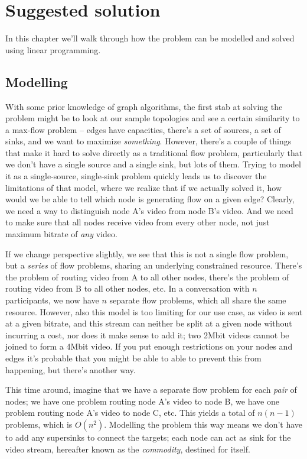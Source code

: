 \chapter{Suggested solution}
\label{chp:suggested-solution}

In this chapter we'll walk through how the problem can be modelled and solved using linear programming.


\section{Modelling}

With some prior knowledge of graph algorithms, the first stab at solving the problem might be to look at our sample topologies and see a certain similarity to a max-flow problem -- edges have capacities, there's a set of sources, a set of sinks, and we want to maximize \emph{something}. However, there's a couple of things that make it hard to solve directly as a traditional flow problem, particularly that we don't have a single source and a single sink, but lots of them. Trying to model it as a single-source, single-sink problem quickly leads us to discover the limitations of that model, where we realize that if we actually solved it, how would we be able to tell which node is generating flow on a given edge? Clearly, we need a way to distinguish node A's video from node B's video. And we need to make sure that all nodes receive video from every other node, not just maximum bitrate of \emph{any} video.

If we change perspective slightly, we see that this is not a single flow problem, but a \emph{series} of flow problems, sharing an underlying constrained resource. There's the problem of routing video from A to all other nodes, there's the problem of routing video from B to all other nodes, etc. In a conversation with $n$ participants, we now have $n$ separate flow problems, which all share the same resource. However, also this model is too limiting for our use case, as video is sent at a given bitrate, and this stream can neither be split at a given node without incurring a cost, nor does it make sense to add it; two 2Mbit videos cannot be joined to form a 4Mbit video. If you put enough restrictions on your nodes and edges it's probable that you might be able to able to prevent this from happening, but there's another way.

This time around, imagine that we have a separate flow problem for each \emph{pair} of nodes; we have one problem routing node A's video to node B, we have one problem routing node A's video to node C, etc. This yields a total of $n(n-1)$ problems, which is $O(n^2)$. Modelling the problem this way means we don't have to add any supersinks to connect the targets; each node can act as sink for the video stream, hereafter known as the \emph{commodity}, destined for itself.

